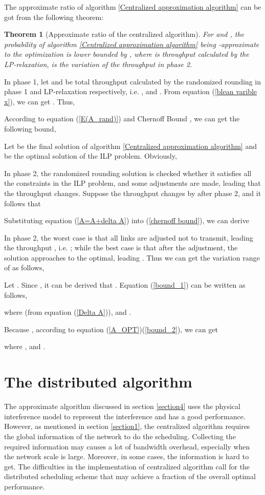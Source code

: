 \documentclass[conference]{IEEEtran}
\begin{document}
The approximate ratio of algorithm \ref{Centralized approximation
algorithm} can be got from the following theorem:

\newtheorem{theorm}{Theorem}
\begin{theorm}[Approximate ratio of the centralized algorithm]\label{theorem 1}
For  and ,
the probability of algorithm \ref{Centralized approximation
algorithm} being -approximate to the optimization is
lower bounded by , where  is throughput
calculated by the LP-relaxation,  is the variation of the
throughput in phase 2.
\end{theorm}
\begin{IEEEproof}
In phase 1, let  and  be total throughput
calculated by the randomized rounding in phase 1 and LP-relaxation
respectively, i.e.
, and
. From equation (\ref{blean varible x}), we can
get . Thus,

According to equation (\ref{E(A_rand)}) and Chernoff Bound
\cite{raghavan1987rrt}, we can get the following bound,

Let  be the final solution of algorithm \ref{Centralized
approximation algorithm} and   be the optimal solution of
the ILP problem. Obviously,

In phase 2, the randomized rounding solution is checked whether it
satisfies all the constraints in the ILP problem, and some
adjustments are made, leading that the throughput changes. Suppose
the throughput changes by  after phase 2, and it follows
that

Substituting equation (\ref{A=A+delta A}) into (\ref{chernoff
bound}), we can derive

In phase 2, the worst case is that all links are adjusted not to
transmit, leading the throughput , i.e. ; while the best case is that after the adjustment, the solution
approaches to the optimal, leading . Thus we can get the variation range of  as
follows,

Let . Since , it
can be derived that . Equation
(\ref{bound_1}) can be written as follows,

where  (from equation (\ref{Delta A})), and
.

Because , according
to equation (\ref{A_OPT})(\ref{bound_2}), we can get

where , and .

\end{IEEEproof}

\section{The distributed algorithm}\label{section5}
The approximate algorithm discussed in section \ref{section4} uses
the physical interference model to represent the interference and
has a good performance. However, as mentioned in section
\ref{section1}, the centralized algorithm requires the global
information of the network to do the scheduling. Collecting the
required information may causes a lot of bandwidth overhead,
especially when the network scale is large. Moreover, in some cases,
the information is hard to get. The difficulties in the
implementation of centralized algorithm call for the distributed
scheduling scheme that may achieve a fraction of the overall optimal
performance.
\end{document}
